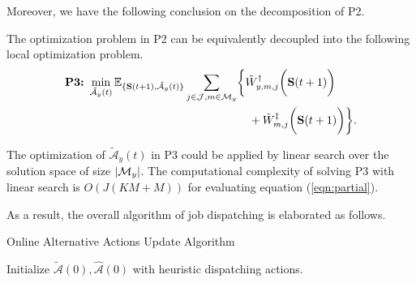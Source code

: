 Moreover, we have the following conclusion on the decomposition of P2.
\begin{lemma}[]
    The optimization problem in P2 can be equivalently decoupled into the following local optimization problem.
    {\small
    \begin{align}
        \textbf{P3:}~
        \min_{ \tilde{\mathcal{A}}_{y}(t) }
        \mathbb{E}_{\set{ \Stat(t+1), \tilde{\mathcal{A}}_{y}(t) }}
        &\sum_{j\in\jSpace,m\in\esSet_{y}} \Brace{
            \tilde{W}^{\AP}_{y,m,j}\Paren{\Stat(t+1)}
            \nonumber\\
            &~~~~~~~~~~~~~~~~~+\tilde{W}^{\ES}_{m,j}\Paren{\Stat(t+1)}
        }.
        \label{eqn:partial}
    \end{align}
    }
\end{lemma}

The optimization of $\tilde{\mathcal{A}}_{y}(t)$ in P3 could be applied by linear search over the solution space of size $|\mathcal{M}_{y}|$.
The computational complexity of solving P3 with linear search is $O(J(KM+M))$ for evaluating equation (\ref{eqn:partial}).

As a result, the overall algorithm of job dispatching is elaborated as follows.
\begin{algorithm}[!]
    \caption{Online Alternative Actions Update Algorithm}\label{alg_1}
    \DontPrintSemicolon %

    Initialize $\tilde{\mathcal{A}}(0),\hat{\mathcal{A}}(0)$ with heuristic dispatching actions.\;
\end{algorithm}

